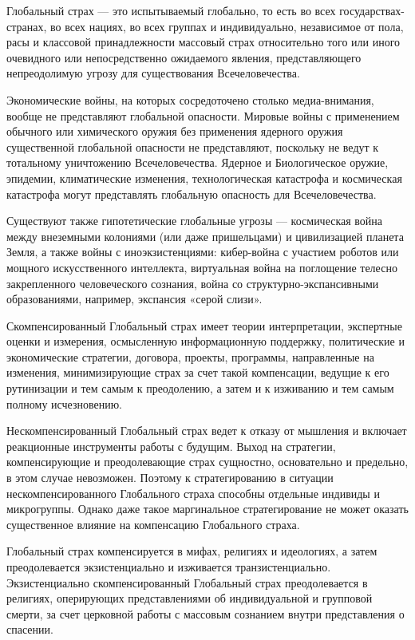 Глобальный страх — это испытываемый глобально, то есть во всех
государствах-странах, во всех нациях, во всех группах и индивидуально,
независимое от пола, расы и классовой принадлежности массовый страх
относительно того или иного очевидного или непосредственно ожидаемого явления,
представляющего непреодолимую угрозу для существования Всечеловечества.

Экономические войны, на которых сосредоточено столько медиа-внимания, вообще не
представляют глобальной опасности. Мировые войны с применением обычного или
химического оружия без применения ядерного оружия существенной глобальной
опасности не представляют, поскольку не ведут к тотальному уничтожению
Всечеловечества. Ядерное и Биологическое оружие, эпидемии, климатические
изменения, технологическая катастрофа и космическая катастрофа могут
представлять глобальную опасность для Всечеловечества.

Существуют также гипотетические глобальные угрозы — космическая война между
внеземными колониями (или даже пришельцами) и цивилизацией планета Земля, а
также войны с иноэкзистенциями: кибер-война с участием роботов или мощного
искусственного интеллекта, виртуальная война на поглощение телесно
закрепленного человеческого сознания, война со структурно-экспансивными
образованиями, например, экспансия «серой слизи».

Скомпенсированный Глобальный страх имеет теории интерпретации, экспертные
оценки и измерения, осмысленную информационную поддержку, политические и
экономические стратегии, договора, проекты, программы, направленные на
изменения, минимизирующие страх за счет такой компенсации, ведущие к его
рутинизации и тем самым к преодолению, а затем и к изживанию и тем самым
полному исчезновению.

Нескомпенсированный Глобальный страх ведет к отказу от мышления и включает
реакционные инструменты работы с будущим. Выход на стратегии, компенсирующие и
преодолевающие страх сущностно, основательно и предельно, в этом случае
невозможен. Поэтому к стратегированию в ситуации нескомпенсированного
Глобального страха способны отдельные индивиды и микрогруппы. Однако даже такое
маргинальное стратегирование не может оказать существенное влияние на
компенсацию Глобального страха.

Глобальный страх компенсируется в мифах, религиях и идеологиях, а затем
преодолевается экзистенциально и изживается транзистенциально. Экзистенциально
скомпенсированный Глобальный страх преодолевается в религиях, оперирующих
представлениями об индивидуальной и групповой смерти, за счет церковной работы
с массовым сознанием внутри представления о спасении.

